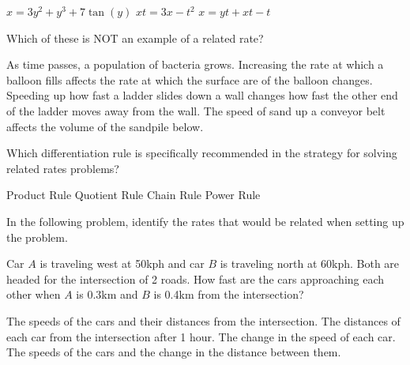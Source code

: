 \documentclass{exam}
\begin{document}
\begin{questions}
\begin{oneparchoices}
\choice $x = 3y^2 + y^3 + 7\tan(y)$
\choice $xt = 3x - t^2$
\choice $x = yt + xt - t$
\end{oneparchoices}
\question Which of these is NOT an example of a related rate?
\begin{choices}
\choice As time passes, a population of bacteria grows.
\choice Increasing the rate at which a balloon fills affects the rate at which the surface are of the balloon changes.
\choice Speeding up how fast a ladder slides down a wall changes how fast the other end of the ladder moves away from the wall.
\choice The speed of sand up a conveyor belt affects the volume of the sandpile below.
\end{choices}
\question Which differentiation rule is specifically recommended in the strategy for solving related rates problems?
\begin{choices}
\choice Product Rule
\choice Quotient Rule
\choice Chain Rule
\choice Power Rule
\end{choices}
\question In the following problem, identify the rates that would be related when setting up the problem.
\begin{center}
Car $A$ is traveling west at 50kph and car $B$ is traveling north at 60kph. Both are headed for the intersection of 2 roads. How fast are the cars approaching each other when $A$ is 0.3km and $B$ is 0.4km from the intersection?
\end{center}
\begin{choices}
\choice The speeds of the cars and their distances from the intersection.
\choice The distances of each car from the intersection after 1 hour.
\choice The change in the speed of each car.
\choice The speeds of the cars and the change in the distance between them.
\end{choices}
\end{questions}
\end{document}
